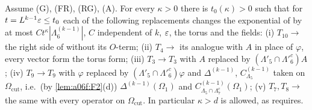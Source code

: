 \begin{proposition}[{\cite[p.~568]{Ba2}}]\label{prop:a06f:C10}
Assume (G), (FR), (RG), (A). For every $\kappa>0$ there is $t_0(\kappa)>0$ such that for $t=L^{k-1}\varepsilon\le t_0$ each of the following replacements changes the exponential of \cite[(2.46)]{Ba2} by at most $Ct^\kappa|\Lambda^{(k-1)}_6|$, $C$ independent of $k$, $\varepsilon$, the torus and the fields: \textup{(i)} $T_{10}\to$ the right side of \cite[(2.47)]{Ba2} without its $O$-term; \textup{(ii)} $T_4\to$ its analogue with $A$ in place of $\varphi$, every vector form the torus form; \textup{(iii)} $T_3\to T_3$ with $A$ replaced by $(\Lambda'_5\cap\Lambda'^c_6)A$; \textup{(iv)} $T_9\to T_9$ with $\varphi$ replaced by $(\Lambda'_5\cap\Lambda'^c_6)\varphi$ and $\Delta^{(k-1)}$, $C^{(k-1)}_{\Lambda_5}$ taken on $\Omega_{\mathrm{cut}}$, i.e.\ (by \cref{lem:a06f:F2}(d)) $\Delta^{(k-1)}(\Omega_1)$ and $C^{(k-1)}_{\Lambda_5\cap\Lambda_7^c}(\Omega_1)$; \textup{(v)} $T_7,T_8\to$ the same with every operator on $\Omega_{\mathrm{cut}}$. In particular $\kappa>d$ is allowed, as \cite[(2.48)]{Ba2} requires.
\end{proposition}

